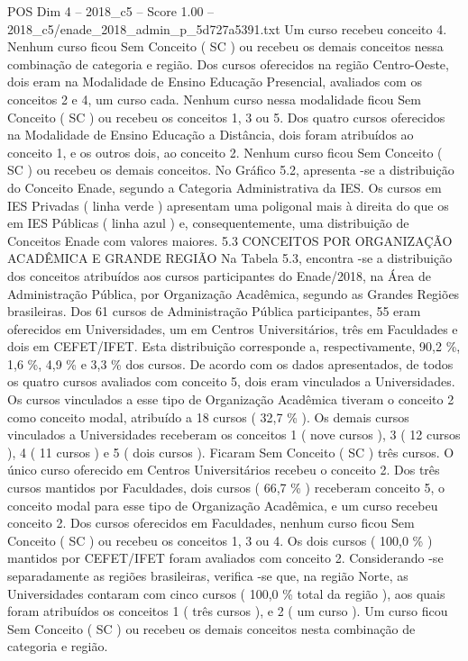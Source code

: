 \begin{textsample}{POS Dim 4 – 2018\_c5 – Score 1.00 – 2018\_c5/enade\_2018\_admin\_p\_5d727a5391.txt}
Um curso recebeu conceito 4.
Nenhum curso ficou Sem Conceito ( SC ) ou recebeu os demais conceitos nessa combinação de categoria e região.
Dos cursos oferecidos na região Centro-Oeste, dois eram na Modalidade de Ensino Educação Presencial, avaliados com os conceitos 2 e 4, um curso cada.
Nenhum curso nessa modalidade ficou Sem Conceito ( SC ) ou recebeu os conceitos 1, 3 ou 5.
Dos quatro cursos oferecidos na Modalidade de Ensino Educação a Distância, dois foram atribuídos ao conceito 1, e os outros dois, ao conceito 2.
Nenhum curso ficou Sem Conceito ( SC ) ou recebeu os demais conceitos.
No Gráfico 5.2, apresenta -se a distribuição do Conceito Enade, segundo a Categoria Administrativa da IES.
Os cursos em IES Privadas ( linha verde ) apresentam uma poligonal mais à direita do que os em IES Públicas ( linha azul ) e, consequentemente, uma distribuição de Conceitos Enade com valores maiores. 5.3 CONCEITOS POR ORGANIZAÇÃO ACADÊMICA E GRANDE REGIÃO Na Tabela 5.3, encontra -se a distribuição dos conceitos atribuídos aos cursos participantes do Enade/2018, na Área de Administração Pública, por Organização Acadêmica, segundo as Grandes Regiões brasileiras.
Dos 61 cursos de Administração Pública participantes, 55 eram oferecidos em Universidades, um em Centros Universitários, três em Faculdades e dois em CEFET/IFET.
Esta distribuição corresponde a, respectivamente, 90,2 \%, 1,6 \%, 4,9 \% e 3,3 \% dos cursos.
De acordo com os dados apresentados, de todos os quatro cursos avaliados com conceito 5, dois eram vinculados a Universidades.
Os cursos vinculados a esse tipo de Organização Acadêmica tiveram o conceito 2 como conceito modal, atribuído a 18 cursos ( 32,7 \% ).
Os demais cursos vinculados a Universidades receberam os conceitos 1 ( nove cursos ), 3 ( 12 cursos ), 4 ( 11 cursos ) e 5 ( dois cursos ).
Ficaram Sem Conceito ( SC ) três cursos.
O único curso oferecido em Centros Universitários recebeu o conceito 2.
Dos três cursos mantidos por Faculdades, dois cursos ( 66,7 \% ) receberam conceito 5, o conceito modal para esse tipo de Organização Acadêmica, e um curso recebeu conceito 2.
Dos cursos oferecidos em Faculdades, nenhum curso ficou Sem Conceito ( SC ) ou recebeu os conceitos 1, 3 ou 4.
Os dois cursos ( 100,0 \% ) mantidos por CEFET/IFET foram avaliados com conceito 2.
Considerando -se separadamente as regiões brasileiras, verifica -se que, na região Norte, as Universidades contaram com cinco cursos ( 100,0 \% total da região ), aos quais foram atribuídos os conceitos 1 ( três cursos ), e 2 ( um curso ).
Um curso ficou Sem Conceito ( SC ) ou recebeu os demais conceitos nesta combinação de categoria e região.

\end{textsample}
